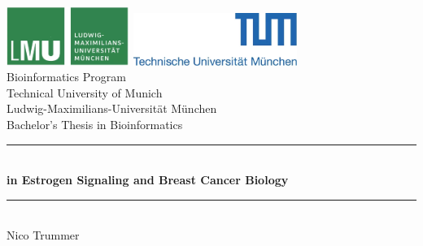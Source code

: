 \documentclass[pdftex,12pt,a4paper]{report}
\newcommand{\HRule}{\rule{\linewidth}{0.5mm}}
\begin{document}
\setcounter{tocdepth}{4}



\begin{titlepage}

    \begin{center}

        \includegraphics[width=0.3\textwidth]{logos/lmu.png}
        \hfill
        \includegraphics[width=0.4\textwidth]{logos/tum.png}
        \\[5cm]

        {\Large Bioinformatics Program}\\[0.5cm]
        {\Large Technical University of Munich}\\[0.5cm]
        {\Large Ludwig-Maximilians-Universität München}\\[2cm]
        {\Large Bachelor's Thesis in Bioinformatics}\\[1.5cm]

        \HRule \\[0.4cm]
        { \huge \bfseries {} in Estrogen Signaling and Breast
        Cancer
        Biology}\\[0.4cm]

        \HRule \\[1.5cm]

        {\Large Nico Trummer}\\[2.5cm]

        \vfill
    \end{center}
\end{titlepage}

\newpage\null\thispagestyle{empty}\newpage
\end{document}
